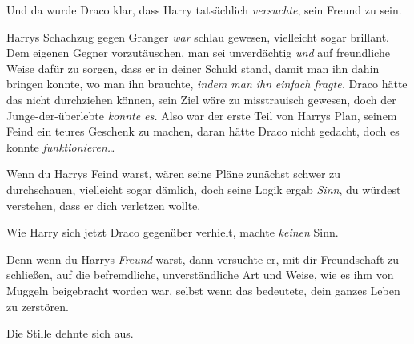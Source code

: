 Und da wurde Draco klar, dass Harry tatsächlich \emph{versuchte}, sein Freund zu sein.

Harrys Schachzug gegen Granger \emph{war} schlau gewesen, vielleicht sogar brillant. Dem eigenen Gegner vorzutäuschen, man sei unverdächtig \emph{und} auf freundliche Weise dafür zu sorgen, dass er in deiner Schuld stand, damit man ihn dahin bringen konnte, wo man ihn brauchte, \emph{indem man ihn} \emph{einfach fragte.} Draco hätte das nicht durchziehen können, sein Ziel wäre zu misstrauisch gewesen, doch der Junge-der-überlebte \emph{konnte es.} Also war der erste Teil von Harrys Plan, seinem Feind ein teures Geschenk zu machen, daran hätte Draco nicht gedacht, doch es konnte \emph{funktionieren…}

Wenn du Harrys Feind warst, wären seine Pläne zunächst schwer zu durchschauen, vielleicht sogar dämlich, doch seine Logik ergab \emph{Sinn}, du würdest verstehen, dass er dich verletzen wollte.

Wie Harry sich jetzt Draco gegenüber verhielt, machte \emph{keinen} Sinn.

Denn wenn du Harrys \emph{Freund} warst, dann versuchte er, mit dir Freundschaft zu schließen, auf die befremdliche, unverständliche Art und Weise, wie es ihm von Muggeln beigebracht worden war, selbst wenn das bedeutete, dein ganzes Leben zu zerstören.

Die Stille dehnte sich aus.

